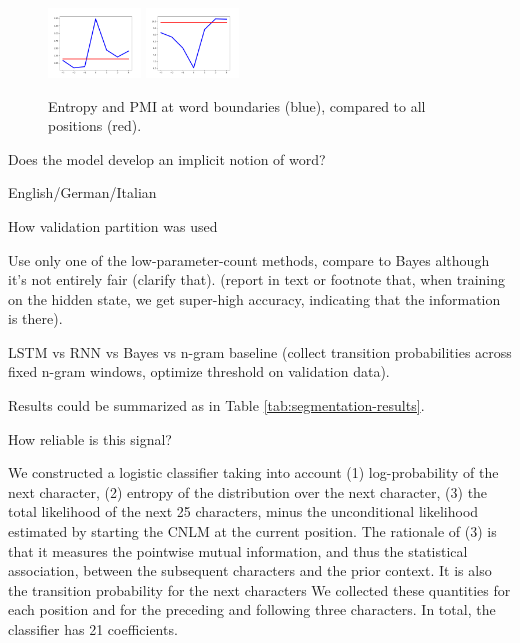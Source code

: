 \begin{figure}
\includegraphics[width=0.22\textwidth]{figures/segmentation-profile-flattened-entropies-german.png}
\includegraphics[width=0.22\textwidth]{figures/segmentation-profile-flattened-pmis-german.png}
	\caption{Entropy and PMI at word boundaries (blue), compared to all positions (red). }\label{fig:syntax-depth}
\end{figure}







Does the model develop an implicit notion of word?

English/German/Italian

How validation partition was used

Use only one of the low-parameter-count methods, compare to Bayes
although it's not entirely fair (clarify that). (report in text or
footnote that, when training on the hidden state, we get super-high
accuracy, indicating that the information is there).

LSTM vs RNN vs Bayes vs n-gram baseline (collect transition
probabilities across fixed n-gram windows, optimize threshold on
validation data).

Results could be summarized as in Table \ref{tab:segmentation-results}.

How reliable is this signal?


We constructed a logistic classifier taking into account (1) log-probability of the next character, (2) entropy of the distribution over the next character, (3) the total likelihood of the next 25 characters, minus the unconditional likelihood estimated by starting the CNLM at the current position.
The rationale of (3) is that it measures the pointwise mutual information, and thus the statistical association, between the subsequent characters and the prior context.
It is also the transition probability for the next characters
We collected these quantities for each position and for the preceding and following three characters.
In total, the classifier has 21 coefficients.

